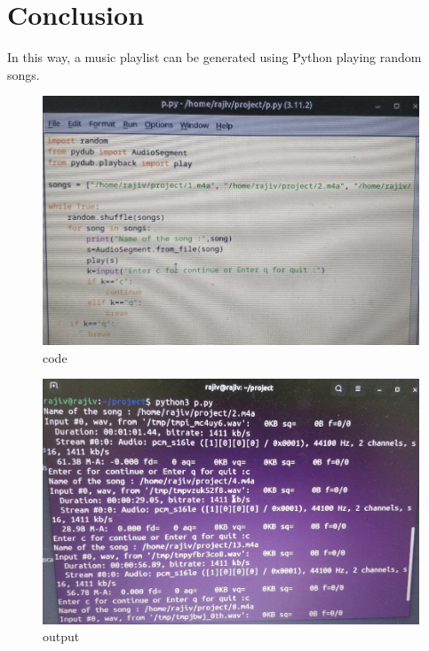 \documentclass{article}
\begin{document}
\section{Conclusion}
In this way, a music playlist can be generated using Python playing random songs.
\begin{figure}[h]
        \includegraphics[width=\linewidth]{1.jpg}     
        \caption{code}
        \label{output}
\end{figure}
\begin{figure}[h]
        \includegraphics[width=\linewidth]{2.jpg}     
        \caption{output}
        \label{output}
\end{figure}
\end{document}
